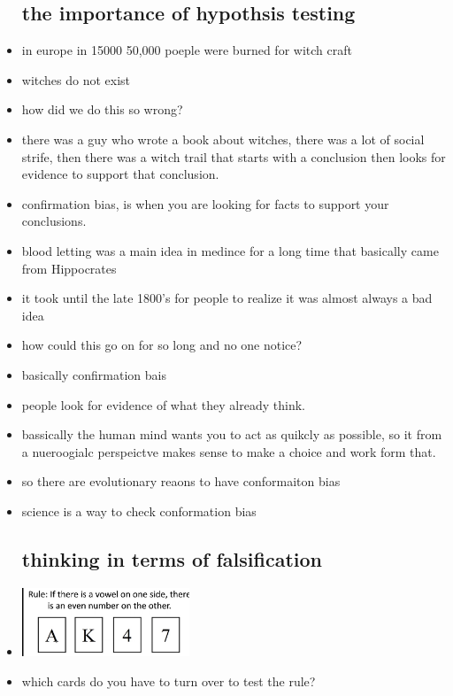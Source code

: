 \documentclass{article}
\begin{document}
\begin{itemize}
\subsection{ the importance of hypothsis testing}
\item in europe in 15000 50,000 poeple were burned for witch craft 
\item witches do not exist
\item how did we do this so wrong? 
\item there was a guy who wrote a book about witches, there was a lot of social strife, then there was a witch trail that starts with a conclusion then looks for evidence to support that conclusion.  
\item confirmation bias, is when you are looking for facts to support your conclusions. 
\item blood letting was a main idea in medince for a long time 
\itme that basically came from Hippocrates
\item it took until the late 1800's for people to realize it was almost always a bad idea 
\item how could this go on for so long and no one notice? 
\item basically confirmation bais 
\item people look for evidence of what they already think.
\item bassically the human mind wants you to act as quikcly as possible, so it from a nueroogialc perspeictve makes sense to make a choice and work form that.
\item so there are evolutionary reaons to have conformaiton bias
\item science is a way to check conformation bias 
\subsection{thinking in terms of falsification}
\item  \includegraphics[width=5cm]{Final_Review/lecture_3/lecture 3 exmaple 2 .jpg} 
\item which cards do you have to turn over to test the rule? 


\end{itemize}
\end{document}
